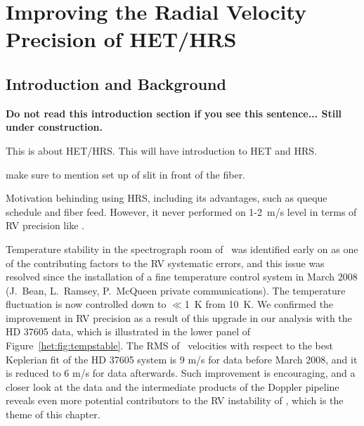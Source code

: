 \chapter{Improving the Radial Velocity Precision of HET/HRS}\label{chap:het}


\section{Introduction and Background}

{\bf Do not read this introduction section if you see this
  sentence... Still under construction.}

This is about HET/HRS. This will have introduction to HET and HRS.

make sure to mention set up of slit in front of the fiber.

Motivation behinding using HRS, including its advantages, such as
queque schedule and fiber feed. However, it never performed on 1-2~m/s
level in terms of RV precision like \keck.

Temperature stability in the spectrograph room of \hrs\ was identified
early on as one of the contributing factors to the RV systematic
errors, and this issue was resolved since the installation of a fine
temperature control system in March 2008 (J.~Bean, L.~Ramsey,
P.~McQueen private communications). The temperature fluctuation is now
controlled down to $\ll$1~K from 10~K. We confirmed the improvement in RV
precision as a result of this upgrade in our analysis with the HD
37605 data, which is illustrated in the lower panel of
Figure~\ref{het:fig:tempstable}. The RMS of \hrs\ velocities with
respect to the best Keplerian fit of the HD 37605 system is 9 m/s for
data before March 2008, and it is reduced to 6 m/s for data
afterwards. Such improvement is encouraging, and a closer look at the
data and the intermediate products of the Doppler pipeline reveals
even more potential contributors to the RV instability of \hrs, which
is the theme of this chapter.


